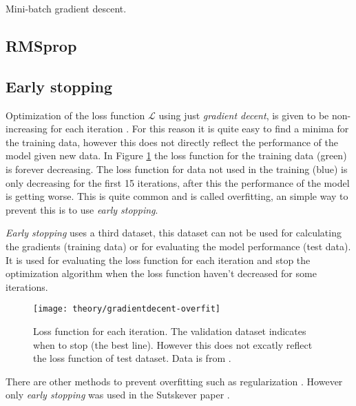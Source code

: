 \begin{algorithm}[h]
 \DontPrintSemicolon
 \caption{Mini-batch gradient descent.}
 \label{algorithm:gradientdecent:mini-batch}
\end{algorithm}

\subsection{RMSprop}

\subsection{Early stopping}

Optimization of the loss function $\mathcal{L}$ using just \textit{gradient decent}, is given to be non-increasing for each iteration \cite{bishop}. For this reason it is quite easy to find a minima for the training data, however this does not directly reflect the performance of the model given new data. In Figure \ref{fig:theory:gradientdecent:overfit} the loss function for the training data (green) is forever decreasing. The loss function for data not used in the training (blue) is only decreasing for the first 15 iterations, after this the performance of the model is getting worse. This is quite common and is called overfitting, an simple way to prevent this is to use \textit{early stopping}.

\textit{Early stopping} uses a third dataset, this dataset can not be used for calculating the gradients (training data) or for evaluating the model performance (test data). It is used for evaluating the loss function for each iteration and stop the optimization algorithm when the loss function haven't decreased for some iterations. \cite{the-elements-of-statistical-learning, bishop, alexgraves}

\begin{figure}[h]
	\centering
	\texttt{[image: theory/gradientdecent-overfit]}
	\caption{Loss function for each iteration. The validation dataset indicates when to stop (the best line). However this does not excatly reflect the loss function of test dataset. Data is from \cite{alexgraves}.}
	\label{fig:theory:gradientdecent:overfit}
\end{figure}

There are other methods to prevent overfitting such as regularization \cite{the-elements-of-statistical-learning, bishop}. However only \textit{early stopping} was used in the Sutskever paper \cite{sutskever}.
